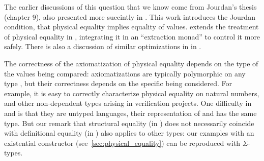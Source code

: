 The earlier discussions of this question that we know come from Jourdan's thesis~\citep*{DBLP:phd/hal/Jourdan16} (chapter 9), also presented more succintly in \citep*{DBLP:journals/jar/BraibantJM14}.
%
This work introduces the Jourdan condition, that physical equality implies equality of values.
%
\citep*{boulme:tel-03356701} extends the treatment of physical equality in \Rocq, integrating it in an ``extraction monad'' to control it more safely.
%
There is also a discussion of similar optimizations in \Lean in \citep*{DBLP:journals/pacmpl/SelsamHM20}.

The correctness of the axiomatization of physical equality depends on the type of the values being compared: axiomatizations are typically polymorphic on any type , but their correctness depends on the specific  being considered.
%
For example, it is easy to correctly characterize physical equality on natural numbers, and other non-dependent types arising in \Rocq verification projects.
%
One difficulty in \HeapLang and \ZooLang is that they are untyped languages, their representation of  and  has the same type.
%
But our remark that structural equality (in \OCaml) does not necessarily coincide with definitional equality (in \Rocq) also applies to other \Rocq types: our examples with an existential  constructor (see~\cref{sec:physical_equality}) can be reproduced with $\Sigma$-types.

